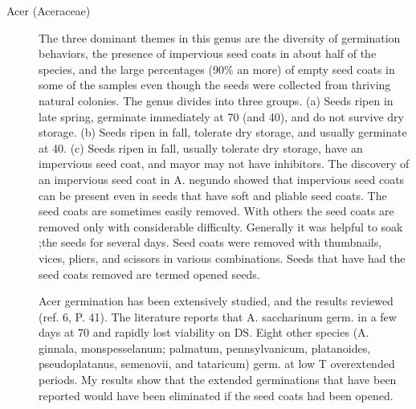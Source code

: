 \begin{description}
\item[Acer (Aceraceae)] The three dominant themes in this genus are the diversity
of germination behaviors, the presence of impervious seed coats in about half of the
species, and the large percentages (90\% an more) of empty seed coats in some of the
samples even though the seeds were collected from thriving natural colonies. The
genus divides into three groups. (a) Seeds ripen in late spring, germinate immediately
at 70 (and 40), and do not survive dry storage. (b) Seeds ripen in fall, tolerate dry
storage, and usually germinate at 40. (c) Seeds ripen in fall, usually tolerate dry
storage, have an impervious seed coat, and mayor may not have inhibitors. The
discovery of an impervious seed coat in A. negundo showed that impervious seed
coats can be present even in seeds that have soft and pliable seed coats.
The seed coats are sometimes easily removed. With others the seed coats are
removed only with considerable difficulty. Generally it was helpful to soak ;the seeds
for several days. Seed coats were removed with thumbnails, vices, pliers, and
scissors in various combinations. Seeds that have had the seed coats removed are
termed opened seeds.

Acer germination has been extensively studied, and the results reviewed (ref. 6,
P. 41). The literature reports that A. saccharinum germ. in a few days at 70 and rapidly
lost viability on DS. Eight other species (A. ginnala, monspesselanum; palmatum,
pennsylvanicum, platanoides, pseudoplatanus, semenovii, and tataricum) germ. at low
T overextended periods. My results show that the extended germinations that have
been reported would have been eliminated if the seed coats had been opened.


\end{description}
